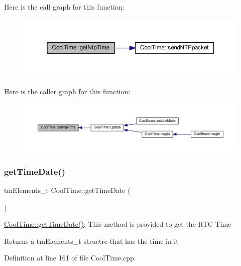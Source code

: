 Here is the call graph for this function\+:\nopagebreak
\begin{figure}[H]
\begin{center}
\leavevmode
\includegraphics[width=350pt]{d6/d49/class_cool_time_a41fbbbfd651c2079f54d4b2911e4c705_cgraph}
\end{center}
\end{figure}
Here is the caller graph for this function\+:\nopagebreak
\begin{figure}[H]
\begin{center}
\leavevmode
\includegraphics[width=350pt]{d6/d49/class_cool_time_a41fbbbfd651c2079f54d4b2911e4c705_icgraph}
\end{center}
\end{figure}
\mbox{\label{class_cool_time_a7a7501c5ca77dd1248bea704c44f986c}} 
\subsubsection{\texorpdfstring{get\+Time\+Date()}{getTimeDate()}}
{\footnotesize\ttfamily tm\+Elements\+\_\+t Cool\+Time\+::get\+Time\+Date (\begin{DoxyParamCaption}{ }\end{DoxyParamCaption})}

\hyperlink{class_cool_time_a7a7501c5ca77dd1248bea704c44f986c}{Cool\+Time\+::get\+Time\+Date()}\+: This method is provided to get the R\+TC Time

\begin{DoxyReturn}{Returns}
a tm\+Elements\+\_\+t structre that has the time in it 
\end{DoxyReturn}


Definition at line 161 of file Cool\+Time.\+cpp.


